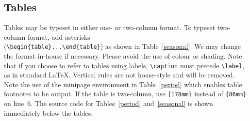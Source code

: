 \documentclass[review,jog]{igs}
\begin{document}
\subsection{Tables}

Tables may be typeset in either one- or two-column format. To typeset two-column format, add asterisks\\
(\verb"\begin{table}...\end{table}") as shown in Table~\ref{seasonal}. We may change the format in-house if necessary. Please avoid the use of colour or shading. Note that if you choose to refer to tables using labels, \verb"\caption" must precede \verb"\label", as in standard \LaTeX. Vertical rules are not house-style and will be removed. Note the use of the minipage environment in Table~\ref{period} which enables table footnotes to be output. If the table is two-column, use \texttt{\{178mm\}} instead of \texttt{\{86mm\}} on line~6. The source code for Tables~\ref{period} and~\ref{seasonal} is shown immediately below the tables.
\end{document}
